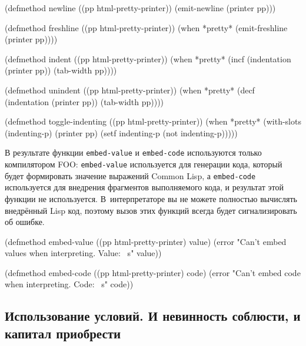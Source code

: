 \begin{myverb}
(defmethod newline ((pp html-pretty-printer))
  (emit-newline (printer pp)))

(defmethod freshline ((pp html-pretty-printer))
  (when *pretty* (emit-freshline (printer pp))))

(defmethod indent ((pp html-pretty-printer))
  (when *pretty* 
    (incf (indentation (printer pp)) (tab-width pp))))

(defmethod unindent ((pp html-pretty-printer))
  (when *pretty* 
    (decf (indentation (printer pp)) (tab-width pp))))

(defmethod toggle-indenting ((pp html-pretty-printer))
  (when *pretty* 
    (with-slots (indenting-p) (printer pp)
      (setf indenting-p (not indenting-p)))))
\end{myverb}

В результате функции \lstinline{embed-value} и \lstinline{embed-code} используются только
компилятором FOO: \lstinline{embed-value} используется для генерации кода, который будет
формировать значение выражений Common Lisp, а \lstinline{embed-code} используется для
внедрения фрагментов выполняемого кода, и результат этой функции не используется.
В~интерпретаторе вы не можете полностью вычислять внедрённый Lisp код, поэтому вызов этих
функций всегда будет сигнализировать об ошибке.

\begin{myverb}
(defmethod embed-value ((pp html-pretty-printer) value)
  (error "Can't embed values when  interpreting. Value: ~s" value))

(defmethod embed-code ((pp html-pretty-printer) code)
  (error "Can't embed code when interpreting. Code: ~s" code))
\end{myverb}


\subsection[Использование условий. И невинность соблюсти, и капитал приобрести]{Использование условий. И невинность соблюсти, и капитал приобрести}

